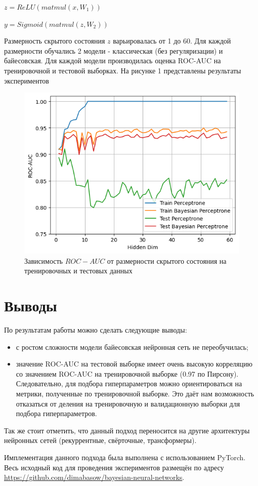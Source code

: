 \documentclass{article}
\begin{document}
$z = ReLU(matmul(x, W_1))$

$y = Sigmoid(matmul(z, W_2))$

Размерность скрытого состояния $z$ варьировалась от 1 до 60. Для каждой размерности обучались 2 модели - классическая (без регуляризации) и байесовская. Для каждой модели производилась оценка ROC-AUC на тренировочной и тестовой выборках. На рисунке 1 представлены результаты экспериментов

\begin{figure}
    \centering
    \includegraphics[width=1\linewidth]{roc_auc.png}
    \caption{Зависимость $ROC-AUC$ от размерности скрытого состояния на тренировочных и тестовых данных}
    \label{fig:enter-label}
\end{figure}

\section{Выводы}
По результатам работы можно сделать следующие выводы:
\begin{itemize}
    \item с ростом сложности модели байесовская нейронная сеть не переобучилась;
    \item значение ROC-AUC на тестовой выборке имеет очень высокую корреляцию со значением ROC-AUC на тренировочной выборке (0.97 по Пирсону). Следовательно, для подбора гиперпараметров можно ориентироваться на метрики, полученные по тренировочной выборке. Это даёт нам возможность отказаться от деления на тренировочную и валидационную выборки для подбора гиперпараметров.
\end{itemize}

Так же стоит отметить, что данный подход переносится на другие архитектуры нейронных сетей (рекуррентные, свёрточные, трансформеры).

Имплементация данного подхода была выполнена с использованием PyTorch. Весь исходный код для проведения экспериментов размещён по адресу \url{https://github.com/dimabasow/bayesian-neural-networks}.
\end{document}
